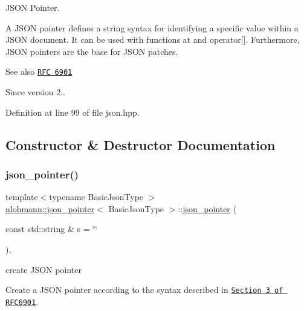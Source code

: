 J\+S\+ON Pointer. 

A J\+S\+ON pointer defines a string syntax for identifying a specific value within a J\+S\+ON document. It can be used with functions {\ttfamily at} and {\ttfamily operator\mbox{[}\mbox{]}}. Furthermore, J\+S\+ON pointers are the base for J\+S\+ON patches.

\begin{DoxySeeAlso}{See also}
\href{https://tools.ietf.org/html/rfc6901}{\tt R\+FC 6901}
\end{DoxySeeAlso}
\begin{DoxySince}{Since}
version 2.. 
\end{DoxySince}


Definition at line 99 of file json.\+hpp.



\subsection{Constructor \& Destructor Documentation}
\mbox{\label{classnlohmann_1_1json__pointer_a7f32d7c62841f0c4a6784cf741a6e4f8}} 
\subsubsection{\texorpdfstring{json\+\_\+pointer()}{json\_pointer()}}
{\footnotesize\ttfamily template$<$typename Basic\+Json\+Type $>$ \\
\hyperlink{classnlohmann_1_1json__pointer}{nlohmann\+::json\+\_\+pointer}$<$ Basic\+Json\+Type $>$\+::\hyperlink{classnlohmann_1_1json__pointer}{json\+\_\+pointer} (\begin{DoxyParamCaption}\item[{const std\+::string \&}]{s = {\ttfamily \char`\"{}\char`\"{}} }\end{DoxyParamCaption})\hspace{0.3cm}{\ttfamily [inline]}, {\ttfamily [explicit]}}



create J\+S\+ON pointer 

Create a J\+S\+ON pointer according to the syntax described in \href{https://tools.ietf.org/html/rfc6901#section-3}{\tt Section 3 of R\+F\+C6901}.


